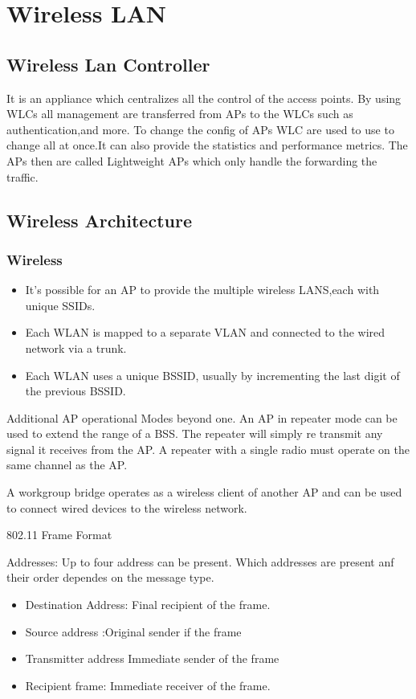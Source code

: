 \documentclass{report}
\begin{document}
	\chapter{Wireless LAN}

	\section{Wireless Lan Controller}
	It is an appliance which centralizes all the control of the access points. By
	using WLCs all management are transferred from APs to the WLCs such as
	authentication,and more. To change the config of APs WLC are used to use to change
	all at once.It can also provide the statistics and performance metrics. The
	APs then are called Lightweight APs which only handle the forwarding the
	traffic.

	\section{Wireless Architecture}

	\subsection{Wireless}
	\begin{itemize}
		\item It's possible for an AP to provide the multiple wireless LANS,each with
			unique SSIDs.

		\item Each WLAN is mapped to a separate VLAN and connected to the wired network
			via a trunk.

		\item Each WLAN uses a unique BSSID, usually by incrementing the last digit
			of the previous BSSID.
	\end{itemize}
	Additional AP operational Modes beyond one. An AP in repeater mode can be used
	to extend the range of a BSS. The repeater will simply re transmit any signal it
	receives from the AP. A repeater with a single radio must operate on the same
	channel as the AP.

	A workgroup bridge operates as a wireless client of another AP and can be used
	to connect wired devices to the wireless network.

	802.11 Frame Format

	Addresses: Up to four address can be present. Which addresses are present anf their
	order dependes on the message type.
	\begin{itemize}
		\item Destination Address: Final recipient of the frame.
	\end{itemize}
	\begin{itemize}
		\item Source address :Original sender if the frame

		\item Transmitter address Immediate sender of the frame

		\item Recipient frame: Immediate receiver of the frame.
	\end{itemize}
\end{document}
